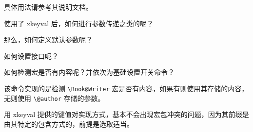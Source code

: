   具体用法请参考其说明文档。

  使用了 xkeyval 后，如何进行参数传递之类的呢？
\begin{texcode}
  \ProcessOptionsX\relax
\end{texcode}

  那么，如何定义默认参数呢？
\begin{texcode}
\end{texcode}

  如何设置接口呢？
\begin{texcode}
  \newcommand{\HTset}[1]{\setkeys{HTNotes.cls}{#1}}
\end{texcode}

  如何检测宏是否有内容呢？并依次为基础设置开关命令？
\begin{texcode}
  \ifdefempty{\Book@Writer}{\@author}{\Book@Writer}
\end{texcode}
  该命令实现的是检测 \verb|\Book@Writer| 宏是否有内容，如果有则使用其存储的内容，无则使用 \verb|\@author| 存储的参数。

  用 xkeyval 提供的键值对实现方式，基本不会出现宏包冲突的问题，因为其前缀是由其特定的包含方式的，前提是选取适当。
